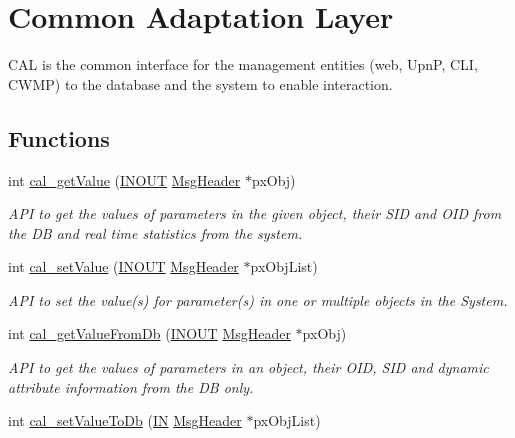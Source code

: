\hypertarget{group__LIBCAL}{\section{Common Adaptation Layer}
\label{group__LIBCAL}
}


C\-A\-L is the common interface for the management entities (web, Upn\-P, C\-L\-I, C\-W\-M\-P) to the database and the system to enable interaction.  


\subsection*{Functions}
\begin{DoxyCompactItemize}
\item 
int \hyperlink{group__LIBCAL_gae3a199f14f16bdc4294dc90a98d26389}{cal\-\_\-get\-Value} (\hyperlink{group__LIBHELP_ga62766f3ea8784d1db62df989f8f33d2d}{I\-N\-O\-U\-T} \hyperlink{structMsgHeader}{Msg\-Header} $\ast$px\-Obj)
\begin{DoxyCompactList}\small\item\em A\-P\-I to get the values of parameters in the given object, their S\-I\-D and O\-I\-D from the D\-B and real time statistics from the system. \end{DoxyCompactList}\item 
int \hyperlink{group__LIBCAL_ga886e5f6e932794f73ee4b9c985ad609d}{cal\-\_\-set\-Value} (\hyperlink{group__LIBHELP_ga62766f3ea8784d1db62df989f8f33d2d}{I\-N\-O\-U\-T} \hyperlink{structMsgHeader}{Msg\-Header} $\ast$px\-Obj\-List)
\begin{DoxyCompactList}\small\item\em A\-P\-I to set the value(s) for parameter(s) in one or multiple objects in the System. \end{DoxyCompactList}\item 
int \hyperlink{group__LIBCAL_ga2490637f30536869ccdf1694639a011a}{cal\-\_\-get\-Value\-From\-Db} (\hyperlink{group__LIBHELP_ga62766f3ea8784d1db62df989f8f33d2d}{I\-N\-O\-U\-T} \hyperlink{structMsgHeader}{Msg\-Header} $\ast$px\-Obj)
\begin{DoxyCompactList}\small\item\em A\-P\-I to get the values of parameters in an object, their O\-I\-D, S\-I\-D and dynamic attribute information from the D\-B only. \end{DoxyCompactList}\item 
int \hyperlink{group__LIBCAL_ga95a08176db1a7c26f079e822b3c00f6d}{cal\-\_\-set\-Value\-To\-Db} (\hyperlink{group__LIBHELP_gac2bbd6d630a06a980d9a92ddb9a49928}{I\-N} \hyperlink{structMsgHeader}{Msg\-Header} $\ast$px\-Obj\-List)

\end{DoxyCompactItemize}
